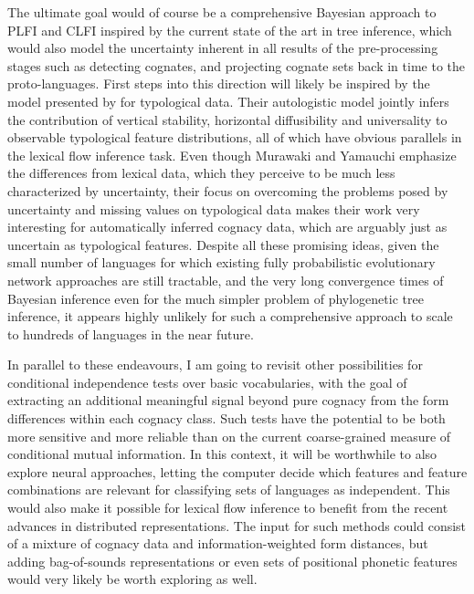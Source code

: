 The ultimate goal would of course be a comprehensive Bayesian approach to PLFI and CLFI inspired by the current state of the art in tree inference, which would also model the uncertainty inherent in all results of the pre-processing stages such as detecting cognates, and projecting cognate sets back in time to the proto-languages. First steps into this direction will likely be inspired by the model presented by \cite{murawaki_yamauchi_2018} for typological data. Their autologistic model jointly infers the contribution of vertical stability, horizontal diffusibility and universality to observable typological feature distributions, all of which have obvious parallels in the lexical flow inference task. Even though Murawaki and Yamauchi emphasize the differences from lexical data, which they perceive to be much less characterized by uncertainty, their focus on overcoming the problems posed by uncertainty and missing values on typological data makes their work very interesting for automatically inferred cognacy data, which are arguably just as uncertain as typological features. Despite all these promising ideas, given the small number of languages for which existing fully probabilistic evolutionary network approaches are still tractable, and the very long convergence times of Bayesian inference even for the much simpler problem of phylogenetic tree inference, it appears highly unlikely for such a comprehensive approach to scale to hundreds of languages in the near future.

In parallel to these endeavours, I am going to revisit other possibilities for conditional independence tests over basic vocabularies, with the goal of extracting an additional meaningful signal beyond pure cognacy from the form differences within each cognacy class. Such tests have the potential to be both more sensitive and more reliable than on the current coarse-grained measure of conditional mutual information. In this context, it will be worthwhile to also explore neural approaches, letting the computer decide which features and feature combinations are relevant for classifying sets of languages as independent. This would also make it possible for lexical flow inference to benefit from the recent advances in distributed representations. The input for such methods could consist of a mixture of cognacy data and information-weighted form distances, but adding bag-of-sounds representations or even sets of positional phonetic features would very likely be worth exploring as well.

